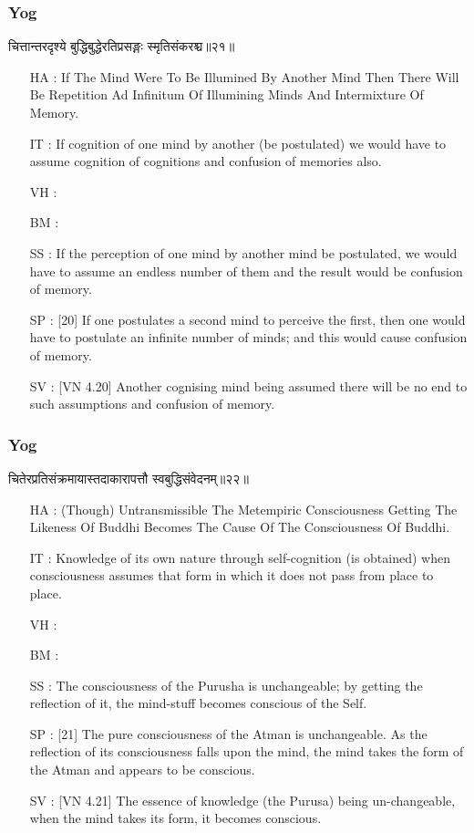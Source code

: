 \begin{frame}[fragile]\frametitle{Yog}
\begin{sanskrit}
चित्तान्तरदृश्ये बुद्धिबुद्धेरतिप्रसङ्गः स्मृतिसंकरश्च॥२१॥
\end{sanskrit}

	\begin{itemize}
	\item [HA]: If The Mind Were To Be Illumined By Another Mind Then There Will Be Repetition Ad Infinitum Of Illumining Minds And Intermixture Of Memory.
	\item [IT]: If cognition of one mind by another (be postulated) we would have to assume cognition of cognitions and confusion of memories also.
	\item [VH]: 
	\item [BM]: 
	\item [SS]: If the perception of one mind by another mind be postulated, we would have to assume an endless number of them and the result would be confusion of memory.
	\item [SP]: [20] If one postulates a second mind to perceive the first, then one would have to postulate an infinite number of minds; and this would cause confusion of memory.
	\item [SV]: [VN 4.20] Another cognising mind being assumed there will be no end to such assumptions and confusion of memory. 
	\end{itemize}
\end{frame}


\begin{frame}[fragile]\frametitle{Yog}
\begin{sanskrit}
चितेरप्रतिसंक्रमायास्तदाकारापत्तौ स्वबुद्धिसंवेदनम्॥२२॥
\end{sanskrit}

	\begin{itemize}
	\item [HA]: (Though) Untransmissible The Metempiric Consciousness Getting The Likeness Of Buddhi Becomes The Cause Of The Consciousness Of Buddhi.
	\item [IT]: Knowledge of its own nature through self-cognition (is obtained) when consciousness assumes that form in which it does not pass from place to place.
	\item [VH]: 
	\item [BM]: 
	\item [SS]: The consciousness of the Purusha is unchangeable; by getting the reflection of it, the mind-stuff becomes conscious of the Self.
	\item [SP]: [21] The pure consciousness of the Atman is unchangeable. As the reflection of its consciousness falls upon the mind, the mind takes the form of the Atman and appears to be conscious.
	\item [SV]: [VN 4.21] The essence of knowledge (the Purusa) being un-changeable, when the mind takes its form, it becomes conscious.
	\end{itemize}
\end{frame}

